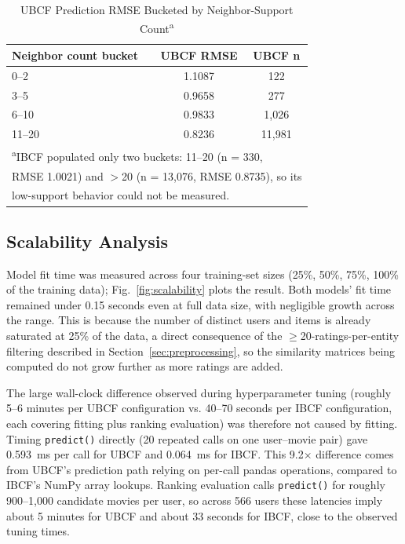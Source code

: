 \documentclass[conference]{IEEEtran}
\begin{document}
\begin{table}[htbp]
\caption{UBCF Prediction RMSE Bucketed by Neighbor-Support Count\textsuperscript{a}}
\begin{center}
\begin{tabular}{|l|c|c|}
\hline
\textbf{Neighbor count bucket} & \textbf{UBCF RMSE} & \textbf{UBCF n} \\
\hline
0--2 & 1.1087 & 122 \\
\hline
3--5 & 0.9658 & 277 \\
\hline
6--10 & 0.9833 & 1{,}026 \\
\hline
11--20 & 0.8236 & 11{,}981 \\
\hline
\multicolumn{3}{l}{\footnotesize\textsuperscript{a}IBCF populated only two buckets: 11--20 (n = 330,} \\
\multicolumn{3}{l}{\footnotesize RMSE 1.0021) and $>$20 (n = 13,076, RMSE 0.8735), so its} \\
\multicolumn{3}{l}{\footnotesize low-support behavior could not be measured.}
\end{tabular}
\label{tab:neighbor}
\end{center}
\end{table}

\subsection{Scalability Analysis}
Model fit time was measured across four training-set sizes (25\%, 50\%, 75\%, 100\% of the training data); Fig.~\ref{fig:scalability} plots the result. Both models' fit time remained under 0.15 seconds even at full data size, with negligible growth across the range. This is because the number of distinct users and items is already saturated at 25\% of the data, a direct consequence of the $\geq$20-ratings-per-entity filtering described in Section~\ref{sec:preprocessing}, so the similarity matrices being computed do not grow further as more ratings are added.

The large wall-clock difference observed during hyperparameter tuning (roughly 5--6 minutes per UBCF configuration vs. 40--70 seconds per IBCF configuration, each covering fitting plus ranking evaluation) was therefore not caused by fitting. Timing \texttt{predict()} directly (20 repeated calls on one user--movie pair) gave 0.593~ms per call for UBCF and 0.064~ms for IBCF. This 9.2$\times$ difference comes from UBCF's prediction path relying on per-call pandas operations, compared to IBCF's NumPy array lookups. Ranking evaluation calls \texttt{predict()} for roughly 900--1,000 candidate movies per user, so across 566 users these latencies imply about 5 minutes for UBCF and about 33 seconds for IBCF, close to the observed tuning times.
\end{document}
